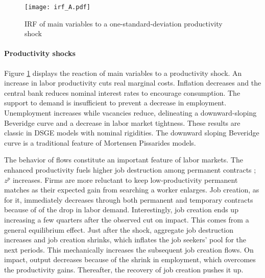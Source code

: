 \begin{figure}[t]
\texttt{[image: irf\_A.pdf]}
\caption{IRF of main variables to a one-standard-deviation productivity shock}
\label{IRF_A}
\end{figure}

\paragraph{Productivity shocks} Figure \ref{IRF_A} displays the reaction of main variables to a productivity shock. An increase in labor productivity cuts real marginal costs. Inflation decreases and the central bank reduces nominal interest rates to encourage consumption. The support to demand is insufficient to prevent a decrease in employment. Unemployment increases while vacancies reduce, delineating a downward-sloping Beveridge curve and a decrease in labor market tightness. These results are classic in DSGE models with nominal rigidities. The downward sloping Beveridge curve is a traditional feature of Mortensen Pissarides models.

The behavior of flows constitute an important feature of labor markets. The enhanced productivity fuels higher job destruction among permanent contracts ; $z^p$ increases. Firms are more reluctant to keep low-productivity permanent matches as their expected gain from searching a worker enlarges. Job creation, as for it, immediately decreases through both permanent and temporary contracts because of of the drop in labor demand. Interestingly, job creation ends up increasing a few quarters after the observed cut on impact. This comes from a general equilibrium effect. Just after the shock, aggregate job destruction increases and job creation shrinks, which inflates the job seekers' pool for the next periods. This mechanically increases the subsequent job creation flows. On impact, output decreases because of the shrink in employment, which overcomes the productivity gains. Thereafter, the recovery of job creation pushes it up. 

